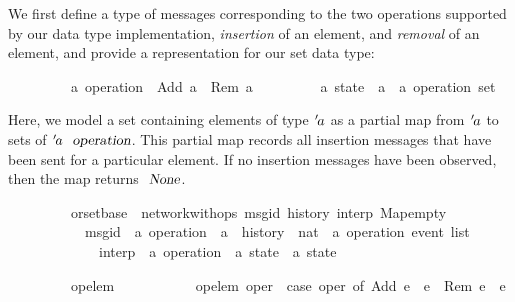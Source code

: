 We first define a type of messages corresponding to the two operations supported by our data type implementation, \emph{insertion} of an element, and \emph{removal} of an element, and provide a representation for our set data type:
\vspace{0.375em}
\begin{isabellebody}
\ \ \ \ \ \ \ \ \ {\isacharprime}a\ operation\ {\isacharequal}\ Add\ {\isacharprime}a\ {\isacharbar}\ Rem\ {\isacharprime}a
\isanewline\isanewline
\ \ \ \ \ \ \ \ \ {\isacharprime}a\ state\ {\isacharequal}\ {\isachardoublequoteopen}{\isacharprime}a\ {\isasymrightharpoonup}\ {\isacharprime}a\ operation\ set{\isachardoublequoteclose}
\end{isabellebody}
\vspace{0.375em}
Here, we model a set containing elements of type ${\emph{$\mskip2mu{'}\mskip-2mu$}}a$ as a partial map from ${\emph{$\mskip2mu{'}\mskip-2mu$}}a$ to sets of ${\isacharprime}a\ \isa{operation}$.
This partial map records all insertion messages that have been sent for a particular element.
If no insertion messages have been observed, then the map returns $\isa{None}$.

\begin{isabellebody}
\ \ \ \ \ \ \ \ \ orset{\isacharunderscore}base\ {\isacharequal}\ network{\isacharunderscore}with{\isacharunderscore}ops\ msg{\isacharunderscore}id\ history\ interp\ {\isachardoublequoteopen}Map{\isachardot}empty{\isachardoublequoteclose}\isanewline
\ \ \ \ \ \ \ \ \ \ \ msg{\isacharunderscore}id\ {\isacharcolon}{\isacharcolon}\ {\isachardoublequoteopen}{\isacharprime}a\ operation\ {\isasymRightarrow}\ {\isacharprime}a{\isachardoublequoteclose}\ \ history\ {\isacharcolon}{\isacharcolon}\ {\isachardoublequoteopen}nat\ {\isasymRightarrow}\ {\isacharprime}a\ operation\ event\ list{\isachardoublequoteclose}\isanewline
\ \ \ \ \ \ \ \ \ \ \ \ \ interp\ {\isacharcolon}{\isacharcolon}\ {\isachardoublequoteopen}{\isacharprime}a\ operation\ {\isasymRightarrow}\ {\isacharprime}a\ state\ {\isasymrightharpoonup}\ {\isacharprime}a\ state{\isachardoublequoteclose}
\end{isabellebody}

\begin{isabellebody}
\ \ \ \ \ \ \ \ \ op{\isacharunderscore}elem\ \isanewline
\ \ \ \ \ \ \ \ \ \ {\isachardoublequoteopen}op{\isacharunderscore}elem\ oper\ {\isasymequiv}\ case\ oper\ of\ Add\ e\ {\isasymRightarrow}\ e\ {\isacharbar}\ Rem\ e\ {\isasymRightarrow}\ e{\isachardoublequoteclose}
\end{isabellebody}

